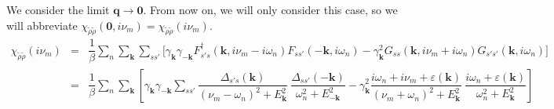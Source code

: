 \documentclass[a4j]{jsarticle}
\begin{document}
We consider the limit $\bm{q} \to \bm{0}$.
From now on, we will only consider this case, so we will abbreviate $\chi_{\tilde{\rho} \tilde{\rho}}(\bm{0},i \nu_{m}) = \chi_{\tilde{\rho} \tilde{\rho}}(i \nu_{m})$.
%
%
%
%
\begin{eqnarray}
	\chi_{\tilde{\rho} \tilde{\rho}}(i \nu_{m})
	&=&
	\dfrac{1}{\beta}
	\sum_{n}
	\sum_{ \bm{k} }
	\sum_{s s'}
	\Big[
		\gamma_{\bm{k}}
		\gamma_{-\bm{k}}
		F_{ s' s }^{\dagger}( \bm{k} , i \nu_{m} - i \omega_{n} )
		F_{ s s' } ( - \bm{k} , i \omega_{n} )
		-
		\gamma_{\bm{k}}^{2}
		G_{ s s } ( \bm{k} , i \nu_{m} + i \omega_{n} )
		G_{ s' s' } ( \bm{k} , i \omega_{n} )
		\Big]
	\nonumber \ \\[2mm]
	&=&
	\dfrac{1}{\beta}
	\sum_{n}
	\sum_{ \bm{k} }
	\left[
		\gamma_{\bm{k}}
		\gamma_{-\bm{k}}
		\sum_{s s'}
		\dfrac{ \Delta_{s' s}(\bm{k}) }{ ( \nu_{m} - \omega_{n} )^{2} + E_{\bm{k}}^{2} }
		\
		\dfrac{ \Delta_{s s'}(-\bm{k}) }{ \omega_{n}^{2} + E_{-\bm{k}}^{2} }
		-
		\gamma_{\bm{k}}^{2}
		\dfrac{ i \omega_{n} + i \nu_{m} + \varepsilon(\bm{k}) }{ ( \nu_{m} + \omega_{n} )^{2} + E_{\bm{k}}^{2} }
		\
		\dfrac{ i \omega_{n} + \varepsilon(\bm{k}) }{ \omega_{n}^{2} + E_{\bm{k}}^{2} }
		\right]
\end{eqnarray}
%
%
%
%
\end{document}
